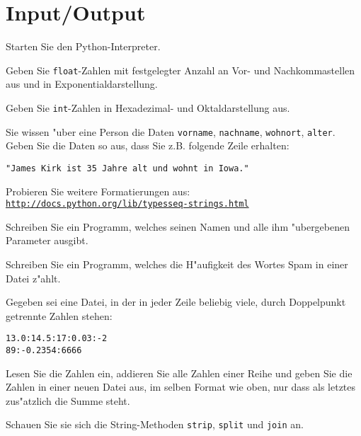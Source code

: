 \section*{Input/Output}
\begin{aufgabe}
Starten Sie den Python-Interpreter. 
\begin{auflistung}
\item Geben Sie \lstinline{float}-Zahlen mit festgelegter Anzahl an Vor- und Nachkommastellen aus und in Exponentialdarstellung.
\item Geben Sie \lstinline{int}-Zahlen in Hexadezimal- und Oktaldarstellung aus.
\item Sie wissen "uber eine Person die Daten \lstinline{vorname}, \lstinline{nachname}, \lstinline{wohnort}, \lstinline{alter}. Geben Sie die Daten so aus, dass Sie z.B. folgende Zeile erhalten: 
\begin{verbatim}
"James Kirk ist 35 Jahre alt und wohnt in Iowa."
\end{verbatim}
\item Probieren Sie weitere Formatierungen aus:\\ \texttt{\underline{http://docs.python.org/lib/typesseq-strings.html}}
\end{auflistung}
\end{aufgabe}

\begin{aufgabe}[Kommandozeilenparameter]
Schreiben Sie ein Programm, welches seinen Namen und alle ihm "ubergebenen Parameter ausgibt.
\end{aufgabe}

\begin{aufgabe}
Schreiben Sie ein Programm, welches die H"aufigkeit des Wortes \glqq Spam\grqq{} in einer Datei z"ahlt. 
\end{aufgabe}

\begin{aufgabe}
Gegeben sei eine Datei, in der in jeder Zeile beliebig viele, durch Doppelpunkt getrennte Zahlen stehen:
\begin{verbatim}
13.0:14.5:17:0.03:-2
89:-0.2354:6666
\end{verbatim}
Lesen Sie die Zahlen ein, addieren Sie alle Zahlen einer Reihe und geben Sie die Zahlen in einer neuen Datei aus, im selben Format wie oben, nur dass als letztes zus"atzlich die Summe steht.

\hinweis Schauen Sie sie sich die String-Methoden \lstinline{strip}, \lstinline{split} und \lstinline{join} an.
\end{aufgabe}


